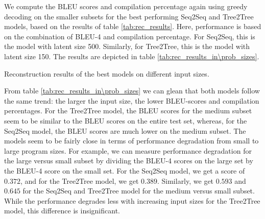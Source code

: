  

We compute the BLEU scores and compilation percentage again using greedy decoding on the smaller subsets for the best performing Seq2Seq and Tree2Tree models, based on the results of table \ref{tab:rec_results}. Here, performance is based on the combination of BLEU-4 and compilation percentage. For Seq2Seq, this is the model with latent size 500. Similarly, for Tree2Tree, this is the model with latent size 150. The results are depicted in table \ref{tab:rec_results_in\prob_sizes}.






\begin{table}
\centering

\caption{Reconstruction results of the best models on different input sizes.}
\label{tab:rec_results_in\prob_sizes}
\end{table}



From table \ref{tab:rec_results_in\prob_sizes} we can glean that both models follow the same trend: the larger the input size, the lower BLEU-scores and compilation percentages. For the Tree2Tree model, the BLEU scores for the medium subset seem to be similar to the BLEU scores on the entire test set, whereas, for the Seq2Seq model, the BLEU scores are much lower on the medium subset. The models seem to be fairly close in terms of performance degradation from small to large program sizes. For example, we can measure performance degradation for the large versus small subset by dividing the BLEU-4 scores on the large set by the BLEU-4 score on the small set. For the Seq2Seq model, we get a score of $0.372$, and for the Tree2Tree model, we get $0.389$. Similarly, we get $0.593$ and $0.645$ for the Seq2Seq and Tree2Tree model for the medium versus small subset. While the performance degrades less with increasing input sizes for the Tree2Tree model, this difference is insignificant. 

